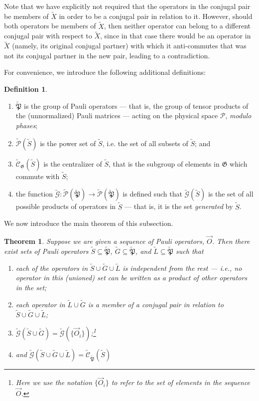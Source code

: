 \documentclass{amsbook}
\theoremstyle{plain}
\newtheorem{theorem}{Theorem}
\theoremstyle{definition}
\newtheorem{definition}{Definition}
\theoremstyle{remark}
\newcommand{\lst}{\vec}
\newcommand{\set}{\tilde}
\newcommand{\genfun}{\tilde{\mathcal{G}}}
\newcommand{\pauligroup}{{\set{\mathfrak{P}}}}
\newcommand{\powerset}{\set{\mathcal{P}}}
\newcommand{\centralizer}{\set{\mathcal{C}}}
\newcommand{\paren}[1]{\left(#1\right)}
\begin{document}
Note that we have explicitly not required that the operators in the conjugal pair be members of $\set X$ in order to be a conjugal pair in relation to it.  However, should both operators be members of $\set X$, then neither operator can belong to a different conjugal pair with respect to $\set X$, since in that case there would be an operator in $\set X$ (namely, its original conjugal partner) with which it anti-commutes that was not its conjugal partner in the new pair, leading to a contradiction.

For convenience, we introduce the following additional definitions:

\begin{definition}

\begin{enumerate}
\item $\pauligroup$ is the group of Pauli operators --- that is, the group of tensor products of the (unnormalized) Pauli matrices --- acting on the physical space $\mathscr{P}$, \emph{modulo phases};
\item $\powerset(\set{S})$ is the power set of $\set S$, i.e. the set of all subsets of $\set S$; and
\item $\centralizer_\mathfrak{G}(\set S)$ is the centralizer of $\set S$, that is the subgroup of elements in $\mathfrak{G}$ which commute with $\set S$;
\item the function $\genfun:\powerset(\pauligroup)\to\powerset(\pauligroup)$ is defined such that $\genfun(\set S)$ is the set of all possible products of operators in $\set S$ --- that is, it is the set \emph{generated} by $\set S$.
\end{enumerate}

\end{definition}

We now introduce the main theorem of this subsection.

\begin{theorem} \label{theorem-SG} Suppose we are given a sequence of Pauli operators, $\lst O$.  Then there exist sets of Pauli operators $\set S\subseteq\pauligroup$, $\set G\subseteq\pauligroup$, and $\set L\subseteq\pauligroup$ such that
\begin{enumerate}
\item each of the operators in $\set S \cup \set G \cup \set L$ is independent from the rest --- i.e., no operator in this (unioned) set can be written as a product of other operators in the set;
\item each operator in $\set L \cup \set G$ is a member of a conjugal pair in relation to $\set S \cup \set G \cup \set L$;
\item $\genfun(\set S \cup \set G)=\genfun\paren{\{\lst O_i\}}$;\footnote{Here we use the notation $\{\vec{O}_i\}$ to refer to the set of elements in the sequence $\vec{O}$.}
\item and $\genfun(\set S \cup \set G \cup \set L)=\centralizer_\pauligroup(\set S )$
\end{enumerate}
\end{theorem}
\end{document}
